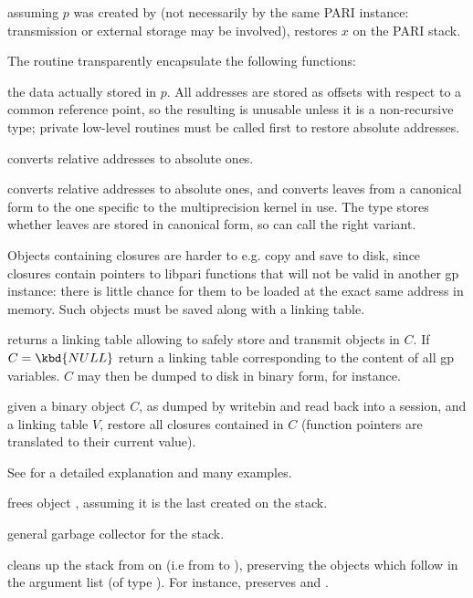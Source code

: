  assuming $p$ was created by 
(not necessarily by the same PARI instance: transmission or external storage
may be involved), restores $x$ on the PARI stack.

\noindent The routine  transparently encapsulate the following
functions:

 the  data actually stored in $p$.
All addresses are stored as offsets with respect to a common reference point,
so the resulting  is unusable unless it is a non-recursive type;
private low-level routines must be called first to restore absolute addresses.

 converts relative addresses to
absolute ones.

 converts relative addresses to
absolute ones, and converts leaves from a canonical form to the one
specific to the multiprecision kernel in use. The  type stores
whether leaves are stored in canonical form, so  can call
the right variant.

\noindent Objects containing closures are harder to e.g. copy and save to disk,
since closures contain pointers to libpari functions that will not be valid in
another gp instance: there is little chance for them to be loaded at the exact
same address in memory. Such objects must be saved along with a linking table.

 returns a linking table allowing to safely
store and transmit  objects in $C$.  If $C = \kbd{NULL}$ return a
linking table corresponding to the content of all gp variables. $C$ may then be
dumped to disk in binary form, for instance.

 given a binary object $C$, as dumped
by writebin and read back into a session, and a linking table $V$, restore all
closures contained in $C$ (function pointers are translated to their current
value).

See  for a detailed explanation and many examples.

 frees object , assuming it is the last created
on the stack.

 general garbage collector
for the stack.

 cleans up the stack from
 on (i.e from  to ), preserving the  objects
which follow in the argument list (of type ). For instance,
 preserves  and .

